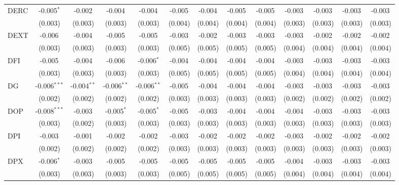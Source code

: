 \begin{table}[!htbp]
\begin{tabular}{@{\extracolsep{5pt}}lcccccccccccc}
 DERC & -0.005$^{*}$ & -0.002$^{}$ & -0.004$^{}$ & -0.004$^{}$ & -0.005$^{}$ & -0.004$^{}$ & -0.005$^{}$ & -0.005$^{}$ & -0.003$^{}$ & -0.003$^{}$ & -0.003$^{}$ & -0.003$^{}$ \\
  & (0.003) & (0.003) & (0.003) & (0.003) & (0.004) & (0.004) & (0.004) & (0.004) & (0.003) & (0.003) & (0.003) & (0.003) \\
 DEXT & -0.006$^{}$ & -0.004$^{}$ & -0.005$^{}$ & -0.005$^{}$ & -0.003$^{}$ & -0.002$^{}$ & -0.003$^{}$ & -0.003$^{}$ & -0.003$^{}$ & -0.002$^{}$ & -0.002$^{}$ & -0.002$^{}$ \\
  & (0.003) & (0.003) & (0.003) & (0.003) & (0.005) & (0.005) & (0.005) & (0.005) & (0.004) & (0.004) & (0.004) & (0.004) \\
 DFI & -0.005$^{}$ & -0.004$^{}$ & -0.006$^{}$ & -0.006$^{*}$ & -0.004$^{}$ & -0.004$^{}$ & -0.004$^{}$ & -0.004$^{}$ & -0.003$^{}$ & -0.003$^{}$ & -0.003$^{}$ & -0.003$^{}$ \\
  & (0.003) & (0.003) & (0.003) & (0.003) & (0.005) & (0.005) & (0.005) & (0.005) & (0.004) & (0.004) & (0.004) & (0.004) \\
 DG & -0.006$^{***}$ & -0.004$^{**}$ & -0.006$^{**}$ & -0.006$^{**}$ & -0.005$^{}$ & -0.004$^{}$ & -0.004$^{}$ & -0.004$^{}$ & -0.003$^{}$ & -0.003$^{}$ & -0.003$^{}$ & -0.003$^{}$ \\
  & (0.002) & (0.002) & (0.002) & (0.002) & (0.003) & (0.003) & (0.003) & (0.003) & (0.002) & (0.002) & (0.002) & (0.002) \\
 DOP & -0.008$^{***}$ & -0.003$^{}$ & -0.005$^{*}$ & -0.005$^{*}$ & -0.005$^{}$ & -0.003$^{}$ & -0.004$^{}$ & -0.004$^{}$ & -0.004$^{}$ & -0.003$^{}$ & -0.003$^{}$ & -0.003$^{}$ \\
  & (0.003) & (0.002) & (0.003) & (0.003) & (0.003) & (0.003) & (0.003) & (0.003) & (0.003) & (0.003) & (0.003) & (0.003) \\
 DPI & -0.003$^{}$ & -0.001$^{}$ & -0.002$^{}$ & -0.002$^{}$ & -0.003$^{}$ & -0.002$^{}$ & -0.002$^{}$ & -0.002$^{}$ & -0.003$^{}$ & -0.002$^{}$ & -0.002$^{}$ & -0.002$^{}$ \\
  & (0.002) & (0.002) & (0.002) & (0.002) & (0.003) & (0.003) & (0.003) & (0.003) & (0.003) & (0.003) & (0.003) & (0.003) \\
 DPX & -0.006$^{*}$ & -0.003$^{}$ & -0.005$^{}$ & -0.005$^{}$ & -0.005$^{}$ & -0.005$^{}$ & -0.005$^{}$ & -0.005$^{}$ & -0.004$^{}$ & -0.003$^{}$ & -0.003$^{}$ & -0.003$^{}$ \\
  & (0.003) & (0.003) & (0.003) & (0.003) & (0.005) & (0.005) & (0.005) & (0.005) & (0.004) & (0.004) & (0.004) & (0.004) \\

\end{tabular}
\end{table}
